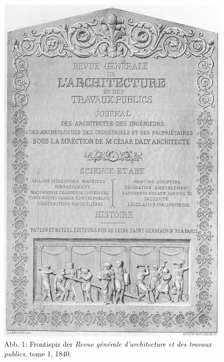 \begin{figure}[htbp]
\centering
\includegraphics{img/wagner-1.jpg}
\caption{Abb. 1: Frontispiz der \emph{Revue générale d'architecture et
des travaux publics}, tome 1, 1840.}
\end{figure}

